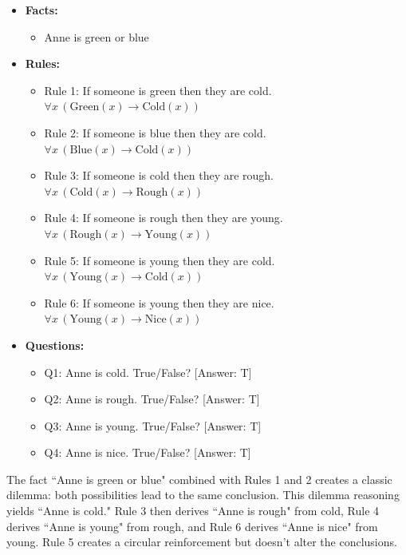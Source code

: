 \documentclass{article} %
\begin{document}
\begin{itemize}
    \item \textbf{Facts:}
    \begin{itemize}
        \item Anne is green or blue
    \end{itemize}
    
    \item \textbf{Rules:}
    \begin{itemize}
        \item Rule 1: If someone is green then they are cold. $\forall x \, (\text{Green}(x) \rightarrow \text{Cold}(x))$
        \item Rule 2: If someone is blue then they are cold. $\forall x \, (\text{Blue}(x) \rightarrow \text{Cold}(x))$
        \item Rule 3: If someone is cold then they are rough. $\forall x \, (\text{Cold}(x) \rightarrow \text{Rough}(x))$
        \item Rule 4: If someone is rough then they are young. $\forall x \, (\text{Rough}(x) \rightarrow \text{Young}(x))$
        \item Rule 5: If someone is young then they are cold. $\forall x \, (\text{Young}(x) \rightarrow \text{Cold}(x))$
        \item Rule 6: If someone is young then they are nice. $\forall x \, (\text{Young}(x) \rightarrow \text{Nice}(x))$
    \end{itemize}
    
    \item \textbf{Questions:}
    \begin{itemize}
        \item Q1: Anne is cold. True/False? [Answer: T]
        \item Q2: Anne is rough. True/False? [Answer: T]  
        \item Q3: Anne is young. True/False? [Answer: T]
        \item Q4: Anne is nice. True/False? [Answer: T]
    \end{itemize}
\end{itemize}

The fact ``Anne is green or blue" combined with Rules 1 and 2 creates a classic dilemma: both possibilities lead to the same conclusion. This dilemma reasoning yields  ``Anne is cold." Rule 3 then derives ``Anne is rough" from cold, Rule 4 derives ``Anne is young" from rough, and Rule 6 derives ``Anne is nice" from young. Rule 5 creates a circular reinforcement but doesn't alter the conclusions.
\end{document}
